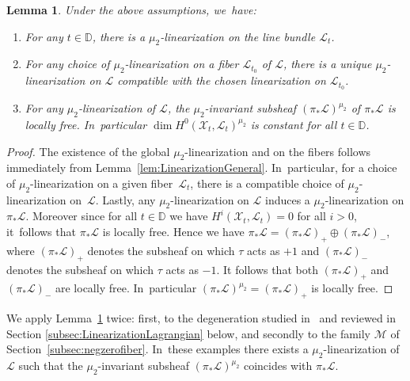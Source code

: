\documentclass[JEP,XML,SOM,Unicode,published]{cedram}
\newenvironment{enumeratea}
{\bgroup\def\theenumi{\alph{enumi}}\begin{enumerate}}
{\end{enumerate}\egroup}
\newcommand{\DD}{{\mathbb D}}
\newcommand\cL{\mathcal{L}}
\newcommand\cM{\mathcal{M}}
\newtheorem{lemm}{Lemma}[section]
\theoremstyle{definition}
\begin{document}
\begin{lemm}\label{lem:LinearizationFamily}
Under the above assumptions, we~have:
\begin{enumeratea}
\item\label{enum:LinearizationFamily1} For any $t\in\DD$, there is a $\mu_2$-linearization on the line bundle $\mathcal{L}_t$.
\item For any choice of $\mu_2$-linearization on a fiber $\mathcal{L}_{t_0}$ of $\mathcal{L}$, there is a unique $\mu_2$\nobreakdash-linearization on $\mathcal{L}$ compatible with the chosen linearization on $\mathcal{L}_{t_0}$.
\item \label{eq:lemmconcl3} For any $\mu_2$-linearization of $\mathcal{L}$, the $\mu_2$-invariant subsheaf $(\pi_*\mathcal{L})^{\mu_2}$ of $\pi_*\mathcal{L}$ is locally free. In~particular $\dim H^0(\mathcal{X}_t,\mathcal{L}_t)^{\mu_2}$ is constant for all $t\in\DD$.
\end{enumeratea}
\end{lemm}

\begin{proof}
The existence of the global $\mu_2$-linearization and on the fibers follows immediately from Lemma~\ref{lem:LinearizationGeneral}. In~particular, for a choice of $\mu_2$-linearization on a given fiber~$\mathcal{L}_t$, there is a compatible choice of $\mu_2$-linearization on~$\mathcal{L}$.
Lastly, any $\mu_2$-linearization on $\mathcal{L}$ induces a $\mu_2$-linearization on $\pi_*\mathcal{L}$.
Moreover since for all $t\in \DD$ we have $H^i(\mathcal{X}_t,\mathcal{L}_t)=0$ for all $i>0$, it~follows that $\pi_*\mathcal{L}$ is locally free.
Hence we have $\pi_*\mathcal{L}=(\pi_*\mathcal{L})_+\oplus (\pi_*\mathcal{L})_-$, where $(\pi_*\mathcal{L})_+$ denotes the subsheaf on which $\tau$ acts as $+1$ and $(\pi_*\mathcal{L})_-$ denotes the subsheaf on which $\tau$ acts as $-1$.
It follows that both $(\pi_*\mathcal{L})_+$ and $(\pi_*\mathcal{L})_-$ are locally free. In~particular $(\pi_*\mathcal{L})^{\mu_2}=(\pi_*\mathcal{L})_+$ is locally free.
\end{proof}

We apply Lemma~\ref{lem:LinearizationFamily} twice: first, to the degeneration studied in~\cite{involutions1} and reviewed in Section \ref{subsec:LinearizationLagrangian} below, and secondly to the family $\cM$ of Section~\ref{subsec:negzerofiber}. In~these examples there exists a $\mu_2$-linearization of $\cL$ such that the $\mu_2$-invariant subsheaf $(\pi_*\mathcal{L})^{\mu_2}$ coincides with $\pi_*\mathcal{L}$.
\end{document}
